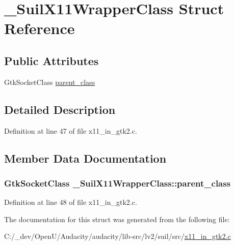 \hypertarget{struct___suil_x11_wrapper_class}{}\section{\+\_\+\+Suil\+X11\+Wrapper\+Class Struct Reference}
\label{struct___suil_x11_wrapper_class}
\subsection*{Public Attributes}
\begin{DoxyCompactItemize}
\item 
Gtk\+Socket\+Class \hyperlink{struct___suil_x11_wrapper_class_ac788dded30b24f18684e01ce9a431de2}{parent\+\_\+class}
\end{DoxyCompactItemize}


\subsection{Detailed Description}


Definition at line 47 of file x11\+\_\+in\+\_\+gtk2.\+c.



\subsection{Member Data Documentation}
\subsubsection[{\texorpdfstring{parent\+\_\+class}{parent_class}}]{\setlength{\rightskip}{0pt plus 5cm}Gtk\+Socket\+Class \+\_\+\+Suil\+X11\+Wrapper\+Class\+::parent\+\_\+class}\hypertarget{struct___suil_x11_wrapper_class_ac788dded30b24f18684e01ce9a431de2}{}\label{struct___suil_x11_wrapper_class_ac788dded30b24f18684e01ce9a431de2}


Definition at line 48 of file x11\+\_\+in\+\_\+gtk2.\+c.



The documentation for this struct was generated from the following file\+:\begin{DoxyCompactItemize}
\item 
C\+:/\+\_\+dev/\+Open\+U/\+Audacity/audacity/lib-\/src/lv2/suil/src/\hyperlink{x11__in__gtk2_8c}{x11\+\_\+in\+\_\+gtk2.\+c}\end{DoxyCompactItemize}
